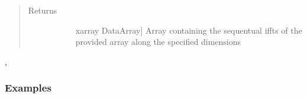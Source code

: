 \documentclass[letterpaper,10pt,english]{sphinxmanual}
\begin{document}
\begin{fulllineitems}
\begin{quote}
\begin{description}
\item[{Returns}] \leavevmode\begin{description}
\item[{}] \leavevmode{[}xarray DataArray{]}
Array containing the sequentual iffts of the provided array along the specified dimensions

\end{description}

\end{description}\end{quote}




, 


\subsubsection*{Examples}


\end{fulllineitems}
\end{document}
